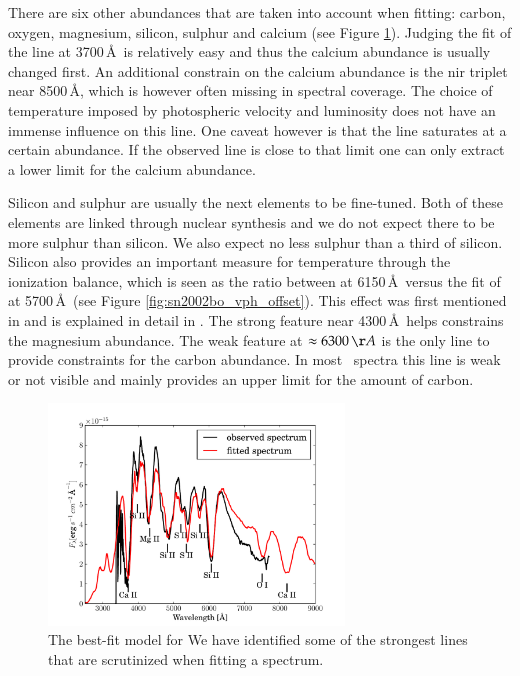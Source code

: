 There are six other abundances that are taken into account when fitting: carbon, oxygen, magnesium, silicon, sulphur and calcium (see Figure \ref{fig:sn2002bo_lineident}). Judging the fit of the  line at 3700\,\AA\ is relatively easy and thus the calcium abundance is usually changed first. An additional constrain on the calcium abundance is the \gls{nir} triplet near 8500\,\AA, which is however often missing in spectral coverage. The choice of temperature imposed by photospheric velocity and luminosity does not have an immense influence on this line. One caveat however is that the  line saturates at a certain abundance. If the observed  line is close to that limit one can only extract a lower limit for the calcium abundance.

Silicon and sulphur are usually the next elements to be fine-tuned. Both of these elements are linked through nuclear synthesis and we do not expect there to be more sulphur than silicon. We also expect no less sulphur than a third of silicon. Silicon also provides an important measure for temperature through the ionization balance, which is seen as the ratio between  at 6150\,\AA\ versus the fit of  at 5700\,\AA\ (see Figure \ref{fig:sn2002bo_vph_offset}). This effect was first mentioned in \cite{1995ApJ...455L.147N} and is explained in detail in \citep{2008MNRAS.389.1087H}. The strong  feature near 4300\,\AA\ helps constrains the magnesium abundance. The weak  feature at $\approx 6300\,\AA$ is the only line to provide constraints for the carbon abundance. In most \sneia\ spectra this line is weak or not visible and mainly provides an upper limit for the amount of carbon.

\begin{figure}[htbp] %
   \centering
   \includegraphics[width=0.7\textwidth]{chapter_dalek/plots/bf2002bo-10_lineid.pdf} 
   \caption{The best-fit model for  We have identified some of the strongest lines that are scrutinized when fitting a  spectrum.}
   \label{fig:sn2002bo_lineident}
\end{figure}

